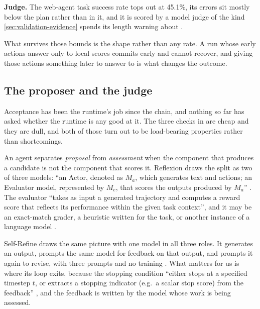 \item \textbf{Judge.} The web-agent task success rate tops out at 45.1\%, its errors sit mostly
below the plan rather than in it, and it is scored by a model judge of the kind
\cref{sec:validation-evidence} spends its length warning about
\citep[\S4.2, \S5.2]{aghzal2026webagents}.

\ei

What survives those bounds is the shape rather than any rate. A run whose early actions answer only
to local scores commits early and cannot recover, and giving those actions something later to answer
to is what changes the outcome.

\subsection{The proposer and the judge}
\label{sec:validation}
\label{sec:validation-actor}

Acceptance has been the runtime's job since the chain, and nothing so far has asked whether the
runtime is any good at it. The three checks in  are cheap and they are dull, and
both of those turn out to be load-bearing properties rather than shortcomings.

\begin{definition}
\label{def:actor-evaluator}
An agent separates \emph{proposal} from \emph{assessment} when the component that produces a candidate is not the component that scores it. Reflexion draws the split as two of three models: ``an Actor, denoted as $M_a$, which generates text and actions; an Evaluator model, represented by $M_e$, that scores the outputs produced by $M_a$'' \citep[\S3]{shinn2023reflexion}. The evaluator ``takes as input a generated trajectory and computes a reward score that reflects its performance within the given task context'', and it may be an exact-match grader, a heuristic written for the task, or another instance of a language model \citep[\S3]{shinn2023reflexion}.
\end{definition}

Self-Refine draws the same picture with one model in all three roles. It generates an output,
prompts the same model for feedback on that output, and prompts it again to revise, with three
prompts and no training \citep[\S2]{madaan2023selfrefine}. What matters for us is where its loop
exits, because the stopping condition ``either stops at a specified timestep $t$, or extracts a
stopping indicator (e.g.\ a scalar stop score) from the feedback''
\citep[\S2]{madaan2023selfrefine}, and the feedback is written by the model whose work is being
assessed.

